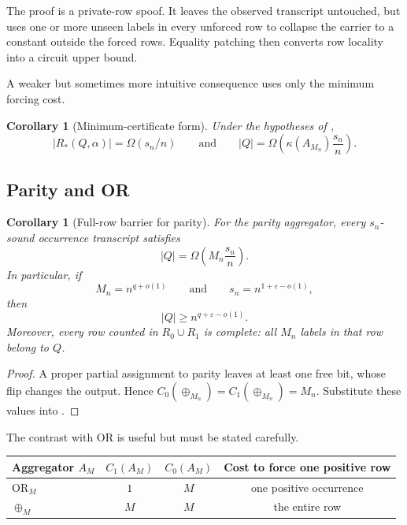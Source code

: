 \documentclass[11pt]{article}
\newtheorem{corollary}[theorem]{Corollary}
\theoremstyle{definition}
\newcommand{\eps}{\varepsilon}
\begin{document}
The proof is a private-row spoof. It leaves the observed transcript untouched, but uses one or more unseen labels in every unforced row to collapse the carrier to a constant outside the forced rows. Equality patching then converts row locality into a circuit upper bound.

A weaker but sometimes more intuitive consequence uses only the minimum forcing cost.

\begin{corollary}[Minimum-certificate form]\label{cor:min-cert-form}
Under the hypotheses of ,
\[
  |R_*(Q,\alpha)|=\Omega(s_n/n)
  \qquad\text{and}\qquad
  |Q|=\Omega\!\left(\kappa(A_{M_n})\frac{s_n}{n}\right).
\]
\end{corollary}

\subsection{Parity and OR}

\begin{corollary}[Full-row barrier for parity]\label{cor:parity-full-row}
For the parity aggregator, every $s_n$-sound occurrence transcript satisfies
\begin{equation}\label{eq:parity-query-lower}
  |Q|=\Omega\!\left(M_n\frac{s_n}{n}\right).
\end{equation}
In particular, if
\[
  M_n=n^{q+o(1)}
  \qquad\text{and}\qquad
  s_n=n^{1+\eps-o(1)},
\]
then
\begin{equation}\label{eq:parity-threshold}
  |Q|\ge n^{q+\eps-o(1)}.
\end{equation}
Moreover, every row counted in $R_0\cup R_1$ is complete: all $M_n$ labels in that row belong to $Q$.
\end{corollary}

\begin{proof}
A proper partial assignment to parity leaves at least one free bit, whose flip changes the output. Hence $C_0(\oplus_{M_n})=C_1(\oplus_{M_n})=M_n$. Substitute these values into .
\end{proof}

The contrast with OR is useful but must be stated carefully.

\begin{center}
\begin{tabular}{@{}lccc@{}}
\toprule
Aggregator $A_M$ & $C_1(A_M)$ & $C_0(A_M)$ & Cost to force one positive row \\
\midrule
$\mathrm{OR}_M$ & $1$ & $M$ & one positive occurrence \\
$\oplus_M$ & $M$ & $M$ & the entire row \\
\bottomrule
\end{tabular}
\end{center}
\end{document}
